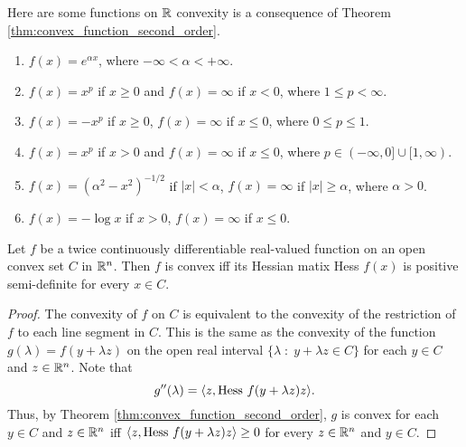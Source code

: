 \documentclass[11pt,a4paper]{article}
\begin{document}
\begin{example}\label{ex:convex_functions}
    Here are some functions on $\mathbb{R}$ convexity is a consequence of Theorem \ref{thm:convex_function_second_order}.
    \begin{enumerate}
        \item $f(x) = e^{\alpha x}$, where $-\infty < \alpha < +\infty$.
        \item $f(x) = x^p$ if $x\ge 0$ and $f(x) = \infty$ if $x<0$, where $1\le p< \infty$.
        \item $f(x) = -x^p$ if $x\ge 0$, $f(x) = \infty$ if $x\le 0$, where $0\le p\le 1$.
        \item $f(x) = x^p$ if $x> 0$ and $f(x) = \infty$ if $x\le 0$, where $p\in (-\infty,0]\cup [1,\infty)$.
        \item $f(x) = (\alpha^2-x^2)^{-1/2}$ if $|x|<\alpha$, $f(x) = \infty$ if $|x|\ge\alpha$, where $\alpha>0$.
        \item $f(x) = -\log{x}$ if $x>0$, $f(x) = \infty$ if $x\le 0$.
    \end{enumerate}
\end{example}

\begin{theorem}
    Let $f$ be a twice continuously differentiable real-valued function on an open convex set $C$ in $\mathbb{R}^n$. Then $f$ is convex iff its Hessian matix Hess $f(x)$ is positive semi-definite for every $x\in C$.
\end{theorem}

\begin{proof}
    The convexity of $f$ on $C$ is equivalent to the convexity of the restriction of $f$ to each line segment in $C$. This is the same as the convexity of the function $g(\lambda) = f(y+\lambda z)$ on the open real interval $\{\lambda\;:\;y+\lambda z\in C\}$ for each $y\in C$ and $z\in \mathbb{R}^n$. Note that 
    \begin{equation*}
        g^{\prime\prime}(\lambda) = \langle z, \mathrm{Hess}\ f(y+\lambda z)z \rangle.
    \end{equation*}
    Thus, by Theorem \ref{thm:convex_function_second_order}, $g$ is convex for each $y\in C$ and $z\in \mathbb{R}^n$ iff $\langle z, \mathrm{Hess}\ f(y+\lambda z)z \rangle\ge 0$ for every $z\in \mathbb{R}^n$ and $y\in C$.
\end{proof}
\end{document}
